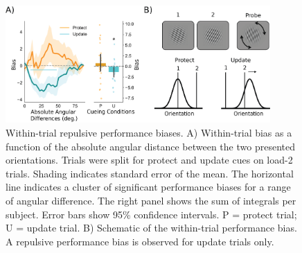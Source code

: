 \documentclass{article}
\begin{document}
\begin{figure}
\centering\includegraphics[width=0.9\textwidth]{figures/figure2_behav_within_trial.png} 
\caption[Within-trial repulsive performance biases.]{Within-trial repulsive performance biases. A) Within-trial bias as a function of the absolute angular distance between the two presented orientations. Trials were split for protect and update cues on load-2 trials. Shading indicates standard error of the mean. The horizontal line indicates a cluster of significant performance biases for a range of angular difference. The right panel shows the sum of integrals per subject. Error bars show 95\% confidence intervals. P = protect trial; U = update trial. B) Schematic of the within-trial performance bias. A repulsive performance bias is observed for update trials only.}
\label{fig:behav_repulsive}\end{figure}
\end{document}
